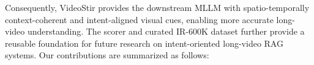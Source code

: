 Consequently, VideoStir provides the downstream MLLM with spatio-temporally context-coherent and intent-aligned visual cues, enabling more accurate long-video understanding. The scorer and curated IR-600K dataset further provide a reusable foundation for future research on intent-oriented long-video RAG systems. Our contributions are summarized as follows:



